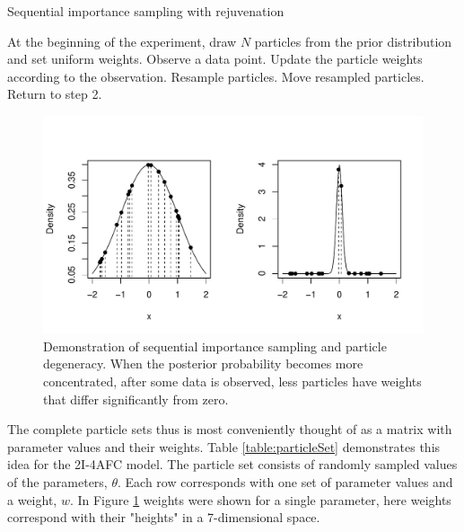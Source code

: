 \documentclass{article}\usepackage{knitr}
\begin{document}
\begin{algorithm}
\caption{Sequential importance sampling with rejuvenation}
\label{alg:resamplemove}
\begin{algorithmic}[1]

\State At the beginning of the experiment, draw $N$ particles from the prior distribution and set uniform weights.
\State Observe a data point.
\State Update the particle weights according to the observation.
        \State Resample particles.
        \State Move resampled particles.
    \EndIf
\State Return to step 2.

\end{algorithmic}
\end{algorithm}

\begin{figure}[!htb]
\begin{center}
\begin{knitrout}
\color{fgcolor}
\includegraphics[width=\maxwidth]{figure/degeneracy-1} 
\end{knitrout}
\end{center}
\caption{ Demonstration of sequential importance sampling and particle degeneracy. When the posterior probability becomes more concentrated, after some data is observed, less particles have weights that differ significantly from zero. }
\label{fig:degeneracy}
\end{figure}

The complete particle sets thus is most conveniently thought of as a matrix with parameter values and their weights. Table \ref{table:particleSet} demonstrates this idea for the 2I-4AFC model. The particle set consists of randomly sampled values of the parameters, $\theta$. Each row corresponds with one set of parameter values and a weight, $w$. In Figure \ref{fig:degeneracy} weights were shown for a single parameter, here weights correspond with their "heights" in a 7-dimensional space. 
\end{document}
